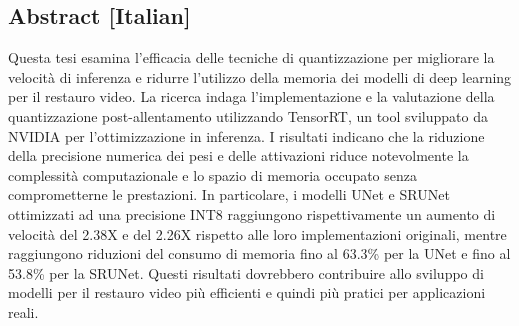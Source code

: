 \documentclass{article}
\begin{document}
\subsection*{Abstract [Italian]}
Questa tesi esamina l’efficacia delle tecniche di quantizzazione per migliorare la velocità di inferenza e ridurre l’utilizzo della memoria dei modelli di deep learning per il restauro video. La ricerca indaga l’implementazione e la valutazione della quantizzazione post-allentamento utilizzando TensorRT, un tool sviluppato da NVIDIA per l'ottimizzazione in inferenza. I risultati indicano che la riduzione della precisione numerica dei pesi e delle attivazioni riduce notevolmente la complessità computazionale e lo spazio di memoria occupato senza comprometterne le prestazioni. In particolare, i modelli UNet e SRUNet ottimizzati ad una precisione INT8 raggiungono rispettivamente un aumento di velocità del 2.38X e del 2.26X rispetto alle loro implementazioni originali, mentre raggiungono riduzioni del consumo di memoria fino al 63.3\% per la UNet e fino al 53.8\% per la SRUNet. Questi risultati dovrebbero contribuire allo sviluppo di modelli per il restauro video più efficienti e quindi più pratici per applicazioni reali.
\end{document}
